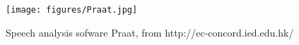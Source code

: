 \begin{figure}[ht]
\center
\texttt{[image: figures/Praat.jpg]}
\caption{Speech analysis sofware Praat, from http://ec-concord.ied.edu.hk/}
\label{fig:praat}
\end{figure}


